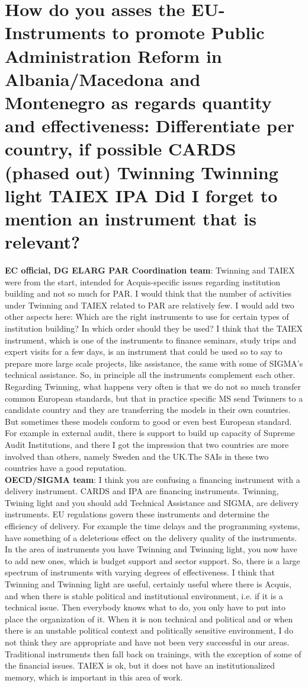 \section{How do you asses the EU-Instruments to promote Public Administration Reform in
Albania/Macedona and Montenegro as regards quantity and effectiveness: Differentiate per country, if possible CARDS (phased out) Twinning Twinning light TAIEX IPA Did I forget to mention an instrument that is relevant? }
\label{sec:relevant}
\textbf{EC official, DG ELARG PAR Coordination team}: Twinning and TAIEX were from the start, intended for Acquis-specific issues regarding institution building and not so much for PAR. I would think that the number of activities under Twinning and TAIEX related to PAR are relatively few. I would add two other aspects here: Which are the right instruments to use for certain types of institution building? In which order should they be used? I think that the TAIEX instrument, which is one of the instruments to finance seminars, study trips and expert visits for a few days, is an instrument that could be used so to say to prepare more large scale projects, like assistance, the same with some of SIGMA's technical assistance. So, in principle all the instruments complement each other. Regarding Twinning, what happens very often is that we do not so much transfer common European standards, but that in practice specific MS send Twinners to a candidate country and they are transferring the models in their own countries. But sometimes these models conform to good or even best European standard. For example in external audit, there is support to build up capacity of Supreme Audit Institutions, and there I got the impression that two countries are more involved than others, namely Sweden and the UK.The SAIs in these two countries have a  good reputation.\\
\textbf{OECD/SIGMA team}: I think you are confusing a financing instrument with a delivery instrument. CARDS and IPA are financing instruments. Twinning, Twining light and you should add Technical Assistance and SIGMA, are delivery instruments. EU regulations govern these instruments and determine the efficiency of delivery. For example the time delays and the programming systems, have something of a deleterious effect on the delivery quality of the instruments. In the area of instruments you have Twinning and Twinning light, you now have to add new ones, which is budget support and sector support. So, there is a large spectrum of instruments with varying degrees of effectiveness. I think that Twinning and Twinning light are useful, certainly useful where there is Acquis, and when there is stable political and institutional environment, i.e. if it is a technical issue. Then everybody knows what to do, you only have to put into place the organization of it. When it is non technical and political and or when there is an unstable political context and politically sensitive environment, I do not think they are appropriate and have not been very successful in our areas. Traditional instruments then fall back on trainings, with the exception of some of the financial issues. TAIEX is ok, but it does not have an institutionalized memory, which is important in this area of work.
